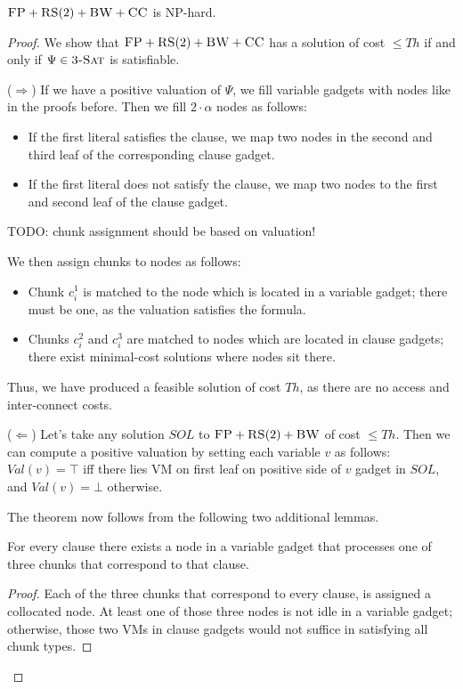 \documentclass[9pt,twocolumn]{scrartcl}
\newcommand{\clauses}{\alpha}
\newcommand{\achunk}{c}
\newcommand{\CC}{\textsc{CC}}
\newcommand{\FP}{\textsc{FP}}
\newcommand{\RS}{\textsc{RS}}
\newcommand{\BW}{\textsc{BW}}
\newcommand{\TSAT}{\textsc{3-Sat}}
\newcommand{\Formula}{\ensuremath{\Psi}}
\newcommand{\Thr}{\ensuremath{Th}}
\newcommand{\Val}{\ensuremath{Val}}
\newcommand{\Sol}{\ensuremath{SOL}}
\begin{document}
\begin{appendix}
\begin{theorem}
$\FP+\RS(2)+\BW+\CC$ is NP-hard.
\end{theorem}
\begin{proof}
We show that $\FP+\RS(2)+\BW+\CC$ has a solution of cost $\leq
  \Thr$ if and only if $\Formula\in \TSAT$ is satisfiable.

($\Rightarrow$) If we have a positive valuation of $\Formula$, we fill variable gadgets with nodes like in
the proofs before. Then we fill $2 \cdot \clauses$ nodes as follows:
\begin{itemize}
\item If the first literal satisfies the clause, we map two nodes in the second and
third leaf of the corresponding clause gadget.
\item If the first literal does not satisfy the clause, we map two nodes to the first
and second leaf of the clause gadget.
\end{itemize}

TODO: chunk assignment should be based on valuation!

We then assign chunks to nodes as follows:
\begin{itemize}
\item Chunk $\achunk_i^1$ is matched to the node which is located in a variable gadget; there
must be one, as the valuation satisfies the formula.
\item Chunks $\achunk_i^2$ and $\achunk_i^3$ are matched to nodes which are
located in clause
gadgets; there exist minimal-cost solutions where nodes sit there.
\end{itemize}

Thus, we have produced a feasible solution of cost $\Thr$, as there are no
access and inter-connect costs.

($\Leftarrow$)
Let's take any solution $\Sol$ to $\FP+\RS(2)+\BW$ of cost $\leq \Thr$.
Then we can compute a positive valuation by setting each variable $v$
as follows:
$\Val(v)= \top$ iff there lies VM on first leaf on positive side of $v$ gadget in $\Sol$,
and $\Val(v)=\bot$ otherwise.


The theorem now follows from the following two additional lemmas.
\begin{lemma}
For every clause there exists a node in a variable gadget that processes one of
  three chunks that correspond to that clause.
\end{lemma}
\begin{proof}
 Each of the three chunks that correspond to every clause,
 is assigned a collocated node.
 At least one of those three nodes is not idle in a variable gadget;
otherwise, those two VMs in clause gadgets would not suffice in
satisfying all chunk types.
\end{proof}


\end{proof}
\end{appendix}
\end{document}
